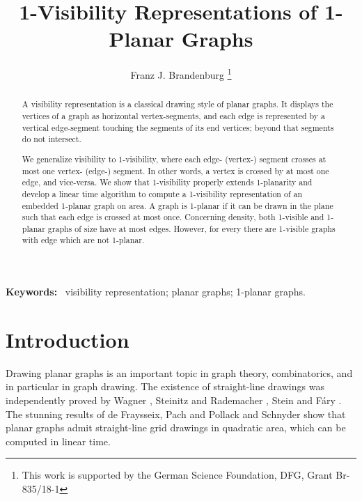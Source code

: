 \documentclass[runningheads]{llncs}
\begin{document}

\title {1-Visibility Representations of 1-Planar Graphs}

\author{Franz J. Brandenburg
\thanks{This work is supported by the German Science Foundation, DFG, Grant
 Br-835/18-1}}

\maketitle

\begin{abstract}
A visibility representation is a classical drawing style of planar
graphs. It displays the vertices of a graph as  horizontal
vertex-segments, and each edge is represented by a vertical
edge-segment touching the segments of its end vertices; beyond that
segments do not intersect.

We generalize visibility to 1-visibility, where each edge- (vertex-)
segment crosses at most one vertex- (edge-) segment. In other words,
a vertex is crossed by at most one edge, and vice-versa. We show
that 1-visibility properly extends 1-planarity and develop a linear
time algorithm to compute a 1-visibility representation of an
embedded 1-planar graph on  area. A graph is
1-planar if it can be drawn in the plane such that each edge is
crossed at most once.
 Concerning  density, both 1-visible and
1-planar graphs of size  have at most  edges. However, for
every   there are 1-visible graphs with  edge which
are not 1-planar.

\end{abstract}


{\bf Keywords:} \, visibility representation; planar graphs;
1-planar graphs.


\section{Introduction}



 Drawing planar graphs is an important topic in graph theory,
 combinatorics, and in particular in graph drawing. The existence of
straight-line drawings was independently proved by Wagner
\cite{w-bv-36}, Steinitz and Rademacher \cite{sr-34}, Stein
\cite{s-cm-51} and F\'{a}ry \cite{fary-48}. The stunning results of
de Fraysseix, Pach and Pollack \cite{fpp-hdpgg-90} and Schnyder
\cite{S-epgg-90} show that planar graphs admit straight-line grid
drawings in quadratic area, which can be computed in linear time.
\end{document}
